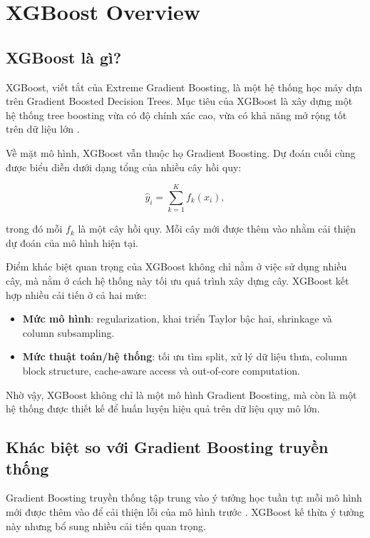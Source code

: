 \section{XGBoost Overview}

\subsection{XGBoost là gì?}

XGBoost, viết tắt của Extreme Gradient Boosting, là một hệ thống học máy dựa trên Gradient Boosted Decision Trees. Mục tiêu của XGBoost là xây dựng một hệ thống tree boosting vừa có độ chính xác cao, vừa có khả năng mở rộng tốt trên dữ liệu lớn \cite{chen2016xgboost}.

Về mặt mô hình, XGBoost vẫn thuộc họ Gradient Boosting. Dự đoán cuối cùng được biểu diễn dưới dạng tổng của nhiều cây hồi quy:

\[
\hat{y}_i = \sum_{k=1}^{K} f_k(x_i),
\]

trong đó mỗi $f_k$ là một cây hồi quy. Mỗi cây mới được thêm vào nhằm cải thiện dự đoán của mô hình hiện tại.

Điểm khác biệt quan trọng của XGBoost không chỉ nằm ở việc sử dụng nhiều cây, mà nằm ở cách hệ thống này tối ưu quá trình xây dựng cây. XGBoost kết hợp nhiều cải tiến ở cả hai mức:

\begin{itemize}
    \item \textbf{Mức mô hình}: regularization, khai triển Taylor bậc hai, shrinkage và column subsampling.
    \item \textbf{Mức thuật toán/hệ thống}: tối ưu tìm split, xử lý dữ liệu thưa, column block structure, cache-aware access và out-of-core computation.
\end{itemize}

Nhờ vậy, XGBoost không chỉ là một mô hình Gradient Boosting, mà còn là một hệ thống được thiết kế để huấn luyện hiệu quả trên dữ liệu quy mô lớn.

\subsection{Khác biệt so với Gradient Boosting truyền thống}

Gradient Boosting truyền thống tập trung vào ý tưởng học tuần tự: mỗi mô hình mới được thêm vào để cải thiện lỗi của mô hình trước \cite{friedman2001gradient}. XGBoost kế thừa ý tưởng này nhưng bổ sung nhiều cải tiến quan trọng.

